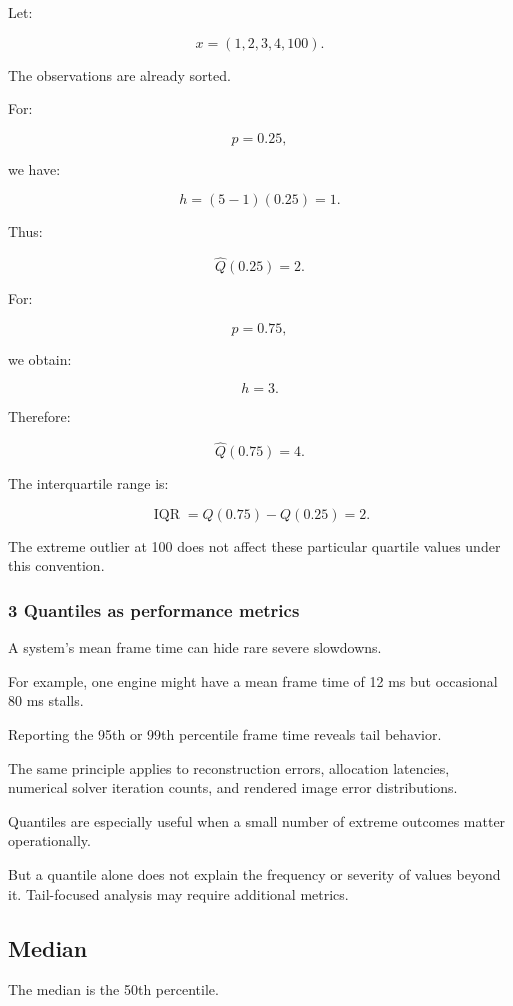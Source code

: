 Let:

\[
 x=(1,2,3,4,100).
\]

The observations are already sorted.

For:

\[
 p=0.25,
\]

we have:

\[
 h=(5-1)(0.25)=1.
\]

Thus:

\[
 \hat Q(0.25)=2.
\]

For:

\[
 p=0.75,
\]

we obtain:

\[
 h=3.
\]

Therefore:

\[
 \hat Q(0.75)=4.
\]

The interquartile range is:

\[
 \boxed{ \operatorname{IQR}=Q(0.75)-Q(0.25)=2 }.
\]

The extreme outlier at 100 does not affect these particular quartile values under this convention.

\subsubsection{3 Quantiles as performance metrics}\label{02-foundations-ii-ch030-quantiles-as-performance-metrics}

A system's mean frame time can hide rare severe slowdowns.

For example, one engine might have a mean frame time of 12 ms but occasional 80 ms stalls.

Reporting the 95th or 99th percentile frame time reveals tail behavior.

The same principle applies to reconstruction errors, allocation latencies, numerical solver iteration counts, and rendered image error distributions.

Quantiles are especially useful when a small number of extreme outcomes matter operationally.

But a quantile alone does not explain the frequency or severity of values beyond it. Tail-focused analysis may require additional metrics.

\subsection{Median}\label{02-foundations-ii-ch030-median}

The median is the 50th percentile.

